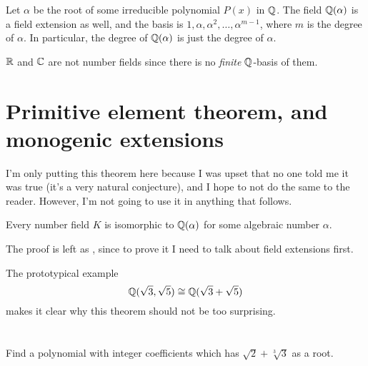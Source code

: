 \begin{example}
	Let $\alpha$ be the root of some irreducible polynomial $P(x)$ in $\mathbb Q$.
	The field $\mathbb Q(\alpha)$ is a field extension as well, and the basis
	is $1, \alpha, \alpha^2, \dots, \alpha^{m-1}$,
	where $m$ is the degree of $\alpha$.
	In particular, the degree of $\mathbb Q(\alpha)$ is just the degree of $\alpha$.
\end{example}
\begin{example}
	$\mathbb R$ and $\mathbb C$ are not number fields since there is no \emph{finite}
	$\mathbb Q$-basis of them.
\end{example}

\section{Primitive element theorem, and monogenic extensions}

I'm only putting this theorem here because I was upset that no one
told me it was true (it's a very natural conjecture),
and I hope to not do the same to the reader.
However, I'm not going to use it in anything that follows.

\begin{theorem}
	Every number field $K$ is isomorphic to $\mathbb Q(\alpha)$
	for some algebraic number $\alpha$.
	\label{thm:artin_primitive_elm}
\end{theorem}
The proof is left as , since to prove it I need to talk
about field extensions first.

The prototypical example \[ \mathbb Q(\sqrt3,\sqrt5) \cong \mathbb Q(\sqrt3+\sqrt5) \]
makes it clear why this theorem should not be too surprising.

\section{\problemhead}

\begin{problem}
	Find a polynomial with integer coefficients
	which has $\sqrt2+\sqrt[3]{3}$ as a root.
\end{problem}

